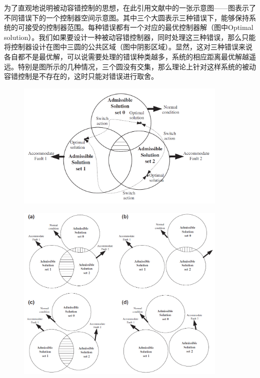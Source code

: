 为了直观地说明被动容错控制的思想，在此引用文献中的一张示意图——图表示了不同错误下的一个控制器空间示意图。其中三个大圆表示三种错误下，能够保持系统的可接受的控制器范围。每种错误都有一个对应的最优控制器解（图中Optimal solution）。我们如果要设计一种被动容错控制器，同时处理这三种错误，那么只能将控制器设计在图中三圆的公共区域（图中阴影区域）。显然，这对三种错误来说各自都不是最优解，可以说需要处理的错误种类越多，系统的相应距离最优解越遥远。特别是图所示的几种情况，三个圆没有交集，那么理论上针对这样系统的被动容错控制是不存在的，这时只能对错误进行取舍。
\begin{figure}[!htp]
    \centering
    \includegraphics[width = 0.9\textwidth]{figure/admissiblesp.png}
\end{figure}
\begin{figure}[!htp]
    \centering
    \includegraphics[width = 0.9\textwidth]{figure/aspoverlap.png}
\end{figure}

